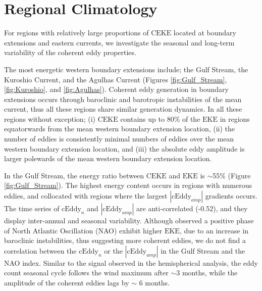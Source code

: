 \documentclass[draft,linenumbers]{agujournal2019}
\newcommand{\EKE}{\textrm{EKE}}
\newcommand{\CEKE}{\textrm{CEKE}}
\newcommand{\cEddy}{\textrm{cEddy}}
\begin{document}

	\section{Regional Climatology}
	\label{sec:CE_regional_stats}
	
	For regions with relatively large proportions of $\CEKE$ located at boundary extensions and eastern currents, we investigate the seasonal and long-term variability of the coherent eddy properties.

	
	The most energetic western boundary extensions include; the Gulf Stream, the Kuroshio Current, and the Agulhas Current (Figures \ref{fig:Gulf_Stream}, \ref{fig:Kuroshio}, and \ref{fig:Agulhas}). 
	Coherent eddy generation in boundary extensions occurs through baroclinic and barotropic instabilities of the mean current, thus all these regions share similar generation dynamics. 
	In all these regions without exception; (i) $\CEKE$ contains up to 80\% of the $\EKE$ in regions equatorwards from the mean western boundary extension location, (ii) the number of eddies is consistently minimal numbers of eddies over the mean western boundary extension location, and (iii) the absolute eddy amplitude is larger polewards of the mean western boundary extension location. 

	In the Gulf Stream, the energy ratio between $\CEKE$ and $\EKE$ is $\sim$55\% (Figure \ref{fig:Gulf_Stream}). 
	The highest energy content occurs in regions with numerous eddies, and collocated with regions where the largest $|\cEddy_{amp}|$ gradients occurs. 
	The time series of $\cEddy_{n}$ and $|\cEddy_{amp}|$ are anti-correlated (-0.52), and they display inter-annual and seasonal variability. 
	Although \citet{Chaudhuri_Oscillation_2009} observed a positive phase of North Atlantic Oscillation (NAO) exhibit higher $\EKE$, due to an increase in baroclinic instabilities, thus suggesting more coherent eddies, we do not find a correlation between the $\cEddy_{n}$ or the $|\cEddy_{amp}|$ in the Gulf Stream and the NAO index. 
	Similar to the signal observed in the hemispherical analysis, the eddy count seasonal cycle follows the wind maximum after $\sim$3 months, while the amplitude of the coherent eddies lags by $\sim$ 6 months. 
\end{document}
